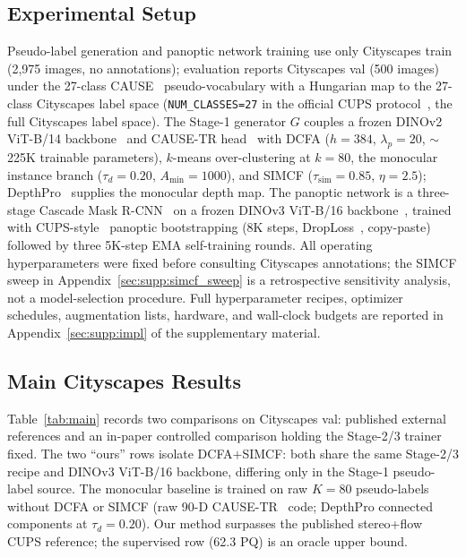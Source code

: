 \documentclass{article}
\begin{document}
\subsection{Experimental Setup}
\label{sec:exp:setup}

Pseudo-label generation and panoptic network training use only Cityscapes train~\cite{cordts2016cityscapes} (2{,}975 images, no annotations); evaluation reports Cityscapes val (500 images) under the 27-class CAUSE~\cite{kim2024cause} pseudo-vocabulary with a Hungarian map to the 27-class Cityscapes label space (\texttt{NUM\_CLASSES=27} in the official CUPS protocol~\cite{hahn2025cups}, the full Cityscapes label space). The Stage-1 generator $G$ couples a frozen DINOv2 ViT-B/14 backbone~\cite{oquab2024dinov2} and CAUSE-TR head~\cite{kim2024cause} with DCFA ($h{=}384$, $\lambda_p{=}20$, $\sim$225K trainable parameters), $k$-means over-clustering at $k{=}80$, the monocular instance branch ($\tau_d{=}0.20$, $A_\text{min}{=}1000$), and SIMCF ($\tau_\text{sim}{=}0.85$, $\eta{=}2.5$); DepthPro~\cite{bochkovskii2024depthpro} supplies the monocular depth map. The panoptic network is a three-stage Cascade Mask R-CNN~\cite{cai2018cascade} on a frozen DINOv3 ViT-B/16 backbone~\cite{simeoni2025dinov3}, trained with CUPS-style~\cite{hahn2025cups} panoptic bootstrapping (8K steps, DropLoss~\cite{wang2023cutler}, copy-paste) followed by three 5K-step EMA self-training rounds. All operating hyperparameters were fixed before consulting Cityscapes annotations; the SIMCF sweep in Appendix~\ref{sec:supp:simcf_sweep} is a retrospective sensitivity analysis, not a model-selection procedure. Full hyperparameter recipes, optimizer schedules, augmentation lists, hardware, and wall-clock budgets are reported in Appendix~\ref{sec:supp:impl} of the supplementary material.


\subsection{Main Cityscapes Results}
\label{sec:exp:main}

Table~\ref{tab:main} records two comparisons on Cityscapes val: published external references and an in-paper controlled comparison holding the Stage-2/3 trainer fixed. The two ``ours'' rows isolate DCFA$+$SIMCF: both share the same Stage-2/3 recipe and DINOv3 ViT-B/16 backbone, differing only in the Stage-1 pseudo-label source. The monocular baseline is trained on raw $K{=}80$ pseudo-labels without DCFA or SIMCF (raw 90-D CAUSE-TR~\cite{kim2024cause} code; DepthPro connected components at $\tau_d{=}0.20$). Our method surpasses the published stereo+flow CUPS reference; the supervised row (62.3 PQ) is an oracle upper bound.
\end{document}
